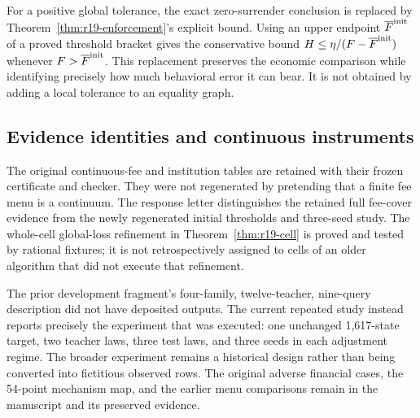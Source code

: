 For a positive global tolerance, the exact zero-surrender conclusion is replaced by Theorem~\ref{thm:r19-enforcement}'s explicit bound. Using an upper endpoint $\overline F^{\rm init}$ of a proved threshold bracket gives the conservative bound $H\leq\eta/(F-\overline F^{\rm init})$ whenever $F>\overline F^{\rm init}$. This replacement preserves the economic comparison while identifying precisely how much behavioral error it can bear. It is not obtained by adding a local tolerance to an equality graph.

\subsection{Evidence identities and continuous instruments}
The original continuous-fee and institution tables are retained with their frozen certificate and checker. They were not regenerated by pretending that a finite fee menu is a continuum. The response letter distinguishes the retained full fee-cover evidence from the newly regenerated initial thresholds and three-seed study. The whole-cell global-loss refinement in Theorem~\ref{thm:r19-cell} is proved and tested by rational fixtures; it is not retrospectively assigned to cells of an older algorithm that did not execute that refinement.

The prior development fragment's four-family, twelve-teacher, nine-query description did not have deposited outputs. The current repeated study instead reports precisely the experiment that was executed: one unchanged 1,617-state target, two teacher laws, three test laws, and three seeds in each adjustment regime. The broader experiment remains a historical design rather than being converted into fictitious observed rows. The original adverse financial cases, the 54-point mechanism map, and the earlier menu comparisons remain in the manuscript and its preserved evidence.
